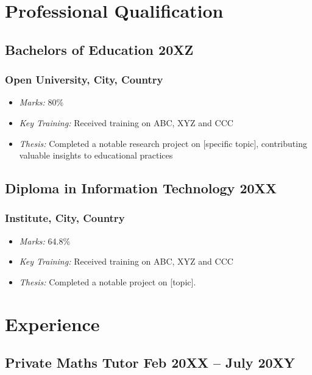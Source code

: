 \documentclass[11pt]{article}
\begin{document}
\section{Professional Qualification}
\subsection{Bachelors of Education \hfill \normalfont 20XZ}
\subsubsection{Open University,  City, Country }
\begin{itemize}
    \item[\textbullet] \textit{Marks:} 80\% %
    \item[\textbullet] \textit{Key Training:} Received training on ABC, XYZ and CCC
    \item[\textbullet] \textit{Thesis:} Completed a notable research project on [specific topic], contributing valuable insights to educational practices
\end{itemize}

\subsection{Diploma in Information Technology \hfill \normalfont 20XX}
\subsubsection{Institute,  City, Country }
\begin{itemize}
    \item[\textbullet] \textit{Marks:} 64.8\% %
    \item[\textbullet] \textit{Key Training:} Received training on ABC, XYZ and CCC
    \item[\textbullet] \textit{Thesis:} Completed a notable project on [topic].
\end{itemize}
\section{Experience}
\subsection{Private Maths Tutor \hfill \normalfont Feb 20XX -- July 20XY}
\end{document}

